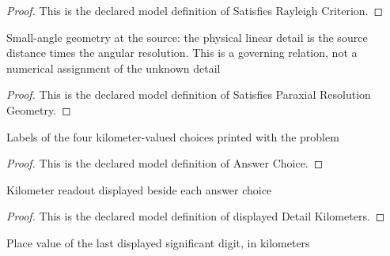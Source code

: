 \begin{proof}
  This is the declared model definition of Satisfies Rayleigh Criterion.
\end{proof}
\begin{definition}
  \label{def:physics:phyx-mini-0123:phyxminiproblems-problemphyxmini0123-satisfiesparaxialresolutiongeometry}
  Small-angle geometry at the source: the physical linear detail is the source distance times the angular resolution. This is a governing relation, not a numerical assignment of the unknown detail
\end{definition}
\begin{proof}
  This is the declared model definition of Satisfies Paraxial Resolution Geometry.
\end{proof}
\begin{definition}
  \label{def:physics:phyx-mini-0123:phyxminiproblems-problemphyxmini0123-answerchoice}
  Labels of the four kilometer-valued choices printed with the problem
\end{definition}
\begin{proof}
  This is the declared model definition of Answer Choice.
\end{proof}
\begin{definition}
  \label{def:physics:phyx-mini-0123:phyxminiproblems-problemphyxmini0123-displayeddetailkilometers}
  Kilometer readout displayed beside each answer choice
\end{definition}
\begin{proof}
  This is the declared model definition of displayed Detail Kilometers.
\end{proof}
\begin{definition}
  \label{def:physics:phyx-mini-0123:phyxminiproblems-problemphyxmini0123-displayedprecisionkilometers}
  Place value of the last displayed significant digit, in kilometers
\end{definition}
